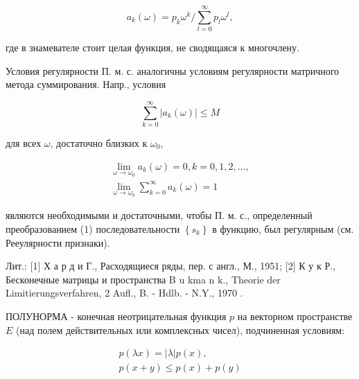 \documentclass[10pt]{article}
\begin{document}
\[

a_{k}(\omega)=p_{k} \omega^{k} / \sum_{l=0}^{\infty} p_{l} \omega^{l},

\]



где в знамевателе стоит целая функция, не сводящаяся к многочлену.



Условия регулярности П. м. с. аналогичны условиям регулярности матричного метода суммирования. Напр., условия



\[

\sum_{k=0}^{\infty}\left|a_{k}(\omega)\right| \leqslant M

\]



для всех $\omega$, достаточно близких к $\omega_{0}$,



\[

\begin{gathered}

\lim _{\omega \rightarrow \omega_{0}} a_{k}(\omega)=0, k=0,1,2, \ldots, \\

\lim _{\omega \rightarrow \omega_{0}} \sum_{k=0}^{\infty} a_{k}(\omega)=1

\end{gathered}

\]



являются необходимыми и достаточными, чтобы П. м. с., определенный преобразованием (1) последовательности $\left\{s_{k}\right\}$ в функцию, был регулярным (см. Рееулярности признаки).



Лит.: [1] Х а р д и Г., Расходящиеся ряды, пер. с англ., М., 1951; [2] К у к Р., Бесконечные матрицы и пространства B u kma n $\mathrm{k}$., Theorie der Limitierungsverfahren, 2 Aufl., B. - Hdlb. - N.Y., 1970 .



ПОЛУНОРМА - конечная неотрицательная функция $p$ на векторном пространстве $E$ (над полем действительных или комплексных чисел), подчиненная условиям:



\[

\begin{gathered}

p(\lambda x)=|\lambda| p(x), \\

p(x+y) \leqslant p(x)+p(y)

\end{gathered}

\]
\end{document}
